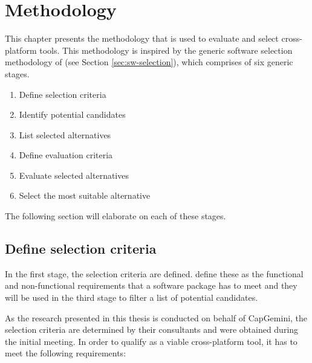 \chapter{Methodology}
\label{chap:methodology}

This chapter presents the methodology that is used to evaluate and select cross-platform tools. This methodology is inspired by the generic software selection methodology of \citet{Jadhav:2011}  (see Section \ref{sec:sw-selection}), which comprises of six generic stages.

\begin{enumerate}
    \item Define selection criteria
    \item Identify potential candidates
    \item List selected alternatives
    \item Define evaluation criteria
    \item Evaluate selected alternatives
    \item Select the most suitable alternative
\end{enumerate}

The following section will elaborate on each of these stages.

\section{Define selection criteria}
\label{sec:selection-criteria}

In the first stage, the selection criteria are defined. \citet{Jadhav:2011} define these as the functional and non-functional requirements that a software package has to meet and they will be used in the third stage to filter a list of potential candidates. 

As the research presented in this thesis is conducted on behalf of CapGemini, the selection criteria are determined by their consultants and were obtained during the initial meeting. In order to qualify as a viable cross-platform tool, it has to meet the following requirements:

